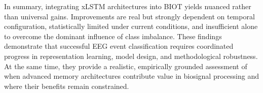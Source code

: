In summary, integrating \ac{xLSTM} architectures into \ac{BIOT} yields nuanced rather than universal gains. Improvements are real but strongly dependent on temporal configuration, statistically limited under current conditions, and insufficient alone to overcome the dominant influence of class imbalance. These findings demonstrate that successful \ac{EEG} event classification requires coordinated progress in representation learning, model design, and methodological robustness. At the same time, they provide a realistic, empirically grounded assessment of when advanced memory architectures contribute value in biosignal processing and where their benefits remain constrained.
